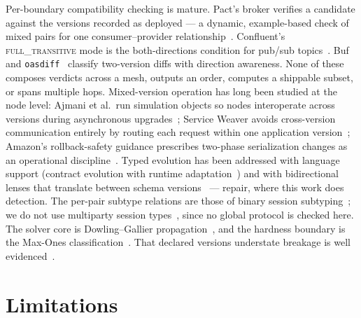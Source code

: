 Per-boundary compatibility checking is mature. Pact's broker verifies
a candidate against the versions recorded as deployed --- a dynamic,
example-based check of mixed pairs for one consumer--provider
relationship~\cite{pactcanideploy}. Confluent's
\textsc{full\_transitive} mode is the both-directions condition for
pub/sub topics~\cite{confluentcompat}. Buf~\cite{bufbreaking} and
\texttt{oasdiff}~\cite{oasdiff} classify two-version diffs with
direction awareness. None of these composes verdicts across a mesh,
outputs an order, computes a shippable subset, or spans multiple hops.
Mixed-version operation has long been studied at the node level:
Ajmani et al.\ run simulation objects so nodes interoperate across
versions during asynchronous upgrades~\cite{ajmani2006modular};
Service Weaver avoids cross-version communication entirely by routing
each request within one application version~\cite{serviceweaver};
Amazon's rollback-safety guidance prescribes two-phase serialization
changes as an operational discipline~\cite{awsrollback}. Typed
evolution has been addressed with language support (contract evolution
with runtime adaptation~\cite{seco2020robust}) and with bidirectional
lenses that translate between schema versions~\cite{litt2020cambria}
--- repair, where this work does detection. The per-pair subtype
relations are those of binary session subtyping~\cite{gay2005subtyping};
we do not use multiparty session types~\cite{honda2008multiparty},
since no global protocol is checked here. The solver core is
Dowling--Gallier propagation~\cite{dowling1984linear}, and the
hardness boundary is the Max-Ones
classification~\cite{khanna2001approximability}. That declared
versions understate breakage is well
evidenced~\cite{raemaekers2014semantic,lercher2024microservice}.

\section{Limitations}
\label{sec:limits}

